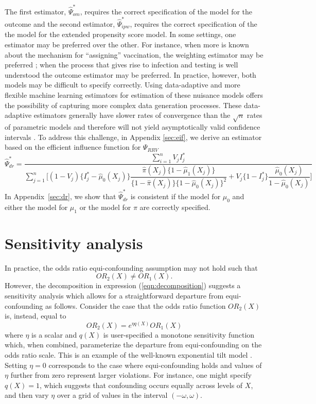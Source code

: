 \documentclass[11pt]{article}
\begin{document}
The first estimator, $\widehat{\Psi}_{om}^*$, requires the correct specification of the model for the outcome and the second estimator, $\widehat{\Psi}_{ipw}^*$, requires the correct specification of the the model for the extended propensity score model. In some settings, one estimator may be preferred over the other. For instance, when more is known about the mechanism for ``assigning'' vaccination, the weighting estimator may be preferred \cite{robins_estimating_1992,braitman_rare_2002}; when the process that gives rise to infection and testing is well understood the outcome estimator may be preferred. In practice, however, both models may be difficult to specify correctly. Using data-adaptive and more flexible machine learning estimators for estimation of these nuisance models offers the possibility of capturing more complex data generation processes. These data-adaptive estimators generally have slower rates of convergence than the $\sqrt{n}$ rates of parametric models and therefore will not yield asymptotically valid confidence intervals \cite{chernozhukov_doubledebiased_2018}. To address this challenge, in Appendix \ref{sec:eif}, we derive an estimator based on the efficient influence function for $\Psi_{RRV}$
\begin{equation}\label{eqn:dr_estimator}
    \widehat{\Psi}_{dr}^* = \dfrac{\sum_{i=1}^n V_jI_j^*}{\sum_{j=1}^n\bigg[ (1-V_j)\{I^*_j - \widehat\mu_0(X_j)\}\dfrac{\widehat\pi(X_j)\{1 - \widehat\mu_1(X_j)\}}{\{1 - \widehat\pi(X_j)\}\{1 - \widehat\mu_0(X_j)\}^2} + V_j\{1-I^*_j\}\dfrac{\widehat\mu_0(X_j)}{1-\widehat \mu_0(X_j)}\bigg]}
\end{equation}
In Appendix~\ref{sec:dr}, we show that $\widehat\Psi_{dr}^*$ is consistent if the model for $\mu_0$ and either the model for $\mu_1$ or the model for $\pi$ are correctly specified.

\section{Sensitivity analysis}
In practice, the odds ratio equi-confounding assumption may not hold such that
$$OR_2(X) \neq OR_1(X).$$ 
However, the decomposition in expression (\ref{eqn:decomposition}) suggests a sensitivity analysis which allows for a straightforward departure from equi-confounding as follows. Consider the case that the odds ratio function $OR_2(X)$ is, instead, equal to
\begin{equation}\label{eq:sensitivity-analysis}OR_2(X) = e^{\eta q(X)} OR_1(X) \end{equation}
where $\eta$ is a scalar and $q(X)$ is user-specified a monotone sensitivity function which, when combined, parameterize the departure from equi-confounding on the odds ratio scale. This is an example of the well-known exponential tilt model \cite{scharfstein_adjusting_1999, liu_identification_2020}. Setting $\eta = 0$ corresponds to the case where equi-confounding holds and values of $\eta$ further from zero represent larger violations. For instance, one might specify $q(X) = 1$, which suggests that confounding occurs equally across levels of $X$, and then vary $\eta$ over a grid of values in the interval $(-\omega, \omega)$.
\end{document}
